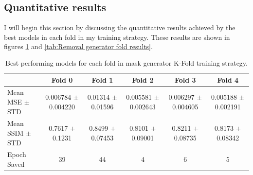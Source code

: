 \documentclass[11pt]{ociamthesis}  %
\begin{document}
\subsection{Quantitative results}
I will begin this section by discussing the quantitative results achieved by the best models in each fold in my training strategy. These results are shown in figures \ref{tab:Mask generator fold results} and \ref{tab:Removal generator fold results}.
\begin{table}[ht]
\centering
\begin{tabular}{|l|c|c|c|c|c|}
\hline
 & Fold 0 & Fold 1 & Fold 2 & Fold 3 & Fold 4 \\
\hline
\makecell{Mean MSE $\pm$ \\ STD} & 
\makecell{0.006784 $\pm$ \\ 0.004220} & 
\makecell{0.01314 $\pm$ \\ 0.01596} & 
\makecell{0.005581 $\pm$ \\ 0.002643} & 
\makecell{0.006297 $\pm$ \\ 0.004605} & 
\makecell{0.005188 $\pm$ \\ 0.002191} \\
\hline
\makecell{Mean SSIM $\pm$ \\ STD} & 
\makecell{0.7617 $\pm$ \\ 0.1231} & 
\makecell{0.8499 $\pm$ \\ 0.07453} & 
\makecell{0.8101 $\pm$ \\ 0.09001} & 
\makecell{0.8211 $\pm$ \\ 0.08735} & 
\makecell{0.8173 $\pm$ \\ 0.08342} \\
\hline
Epoch Saved & 39 & 44 & 4 & 6 & 5 \\
\hline
\end{tabular}
\caption{Best performing models for each fold in mask generator K-Fold training strategy.}
\label{tab:Mask generator fold results}
\end{table}
\end{document}
